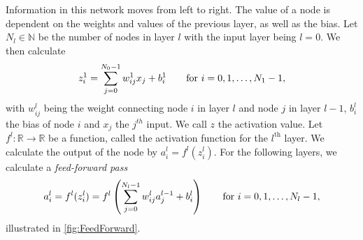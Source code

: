 \documentclass{article}
\theoremstyle{definition}
\begin{document}
Information in this network moves from left to right. The value of a node is dependent on the weights and values of the previous layer, as well as the bias. Let $N_l \in \mathbb{N}$ be the number of nodes in layer $l$ with the input layer being $l = 0$. We then calculate
\begin{equation*}
    z_{i}^1 = \sum_{j = 0}^{N_0 - 1} w_{ij}^1 x_j + b_i^1 \qquad \textnormal{for} \ i = 0, 1, \ldots, N_1 - 1,
\end{equation*}
with $w^l_{ij}$ being the weight connecting node $i$ in layer $l$ and node $j$ in layer $l-1$, $b_i^l$ the bias of node $i$ and $x_j$ the $j^{th}$ input. We call $z$ the activation value. Let $f^l: \mathbb{R} \to \mathbb{R}$ be a function, called the activation function for the $l^{\text{th}}$ layer. We calculate the output of the node by $a_i^l = f^l(z_i^l)$. For the following layers, we calculate a \textit{feed-forward pass}
\begin{equation*}
    a_i^l = f^l(z_{i}^l) = f^l \left( \sum_{j = 0}^{N_l - 1} w_{ij}^l a_j^{l-1} + b_i^{l} \right) \qquad \textnormal{for} \ i = 0, 1, \ldots, N_l - 1,
\end{equation*}
illustrated in \autoref{fig:FeedForward}.
\end{document}
